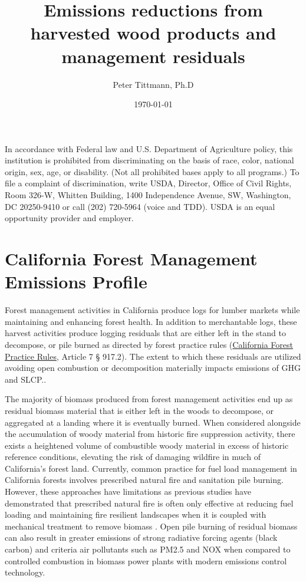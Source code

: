 \documentclass[a4paper,titlepage]{article}
\affil[1]{UC Berkeley, Woody Biomass Group}
\author{Peter Tittmann, Ph.D}
\date{\today}
\title{Emissions reductions from harvested wood products and management residuals}
\begin{document}
\maketitle
\tableofcontents

\thispagestyle{empty}

\listoffigures

\listoftables

\newpage

\begin{vplace}[0.7]

\small In accordance with Federal law and U.S. Department of Agriculture policy, this institution is prohibited from discriminating on the basis of race, color, national origin, sex, age, or disability. (Not all prohibited bases apply to all programs.)
To file a complaint of discrimination, write USDA, Director, Office of Civil Rights, Room 326-W, Whitten Building, 1400 Independence Avenue, SW, Washington, DC 20250-9410 or call (202) 720-5964 (voice and TDD).
USDA is an equal opportunity provider and employer.
\end{vplace}

\pagebreak
\section{California Forest Management Emissions Profile}
\label{sec:orgheadline3}

Forest management activities in California produce logs for lumber markets while maintaining and enhancing forest health. In addition to merchantable logs, these harvest activities produce logging residuals that are either left in the stand to decompose, or pile burned as directed by forest practice rules (\href{http://calfire.ca.gov/resource_mgt/downloads/2013_FP_Rulebook_with_Tech_RuleNo1.pdf}{California Forest Practice Rules}, Article 7 §
917.2). The extent to which these residuals are utilized avoiding open combustion or decomposition materially impacts emissions of \ac{GHG} and \ac{SLCP}..

The majority of biomass produced from forest management activities end up as residual biomass material that is either left in the woods to decompose, or aggregated at a landing where it is eventually burned. When considered alongside the accumulation of woody material from historic fire suppression activity, there exists a heightened volume of combustible woody material in excess of historic reference conditions, elevating the risk of damaging wildfire in much of California’s forest land. Currently, common practice for fuel load management in California forests involves prescribed natural fire and sanitation pile burning. However, these approaches have limitations as previous studies have demonstrated that prescribed natural fire is often only effective at reducing fuel loading and maintaining fire resilient landscapes when it is coupled with mechanical treatment to remove biomass \cite{Stephens2009c}. Open pile burning of residual biomass can also result in greater emissions of strong radiative forcing agents (black carbon) and criteria air pollutants such as \ac{PM2.5} and \ac{NOX} when compared to controlled combustion in biomass power plants with modern emissions control technology. 
\end{document}
